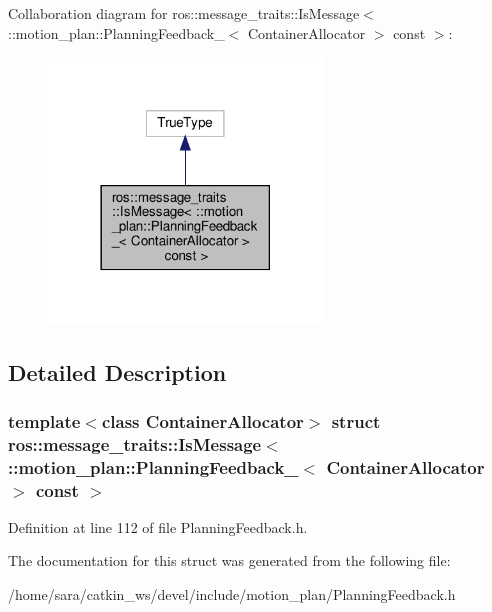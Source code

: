 Collaboration diagram for ros\+:\+:message\+\_\+traits\+:\+:Is\+Message$<$ \+:\+:motion\+\_\+plan\+:\+:Planning\+Feedback\+\_\+$<$ Container\+Allocator $>$ const $>$\+:
\nopagebreak
\begin{figure}[H]
\begin{center}
\leavevmode
\includegraphics[width=206pt]{structros_1_1message__traits_1_1IsMessage_3_01_1_1motion__plan_1_1PlanningFeedback___3_01Contain2c814a87ae0cec80a0572b536fb34577}
\end{center}
\end{figure}


\subsection{Detailed Description}
\subsubsection*{template$<$class Container\+Allocator$>$\newline
struct ros\+::message\+\_\+traits\+::\+Is\+Message$<$ \+::motion\+\_\+plan\+::\+Planning\+Feedback\+\_\+$<$ Container\+Allocator $>$ const $>$}



Definition at line 112 of file Planning\+Feedback.\+h.



The documentation for this struct was generated from the following file\+:\begin{DoxyCompactItemize}
\item 
/home/sara/catkin\+\_\+ws/devel/include/motion\+\_\+plan/Planning\+Feedback.\+h\end{DoxyCompactItemize}
